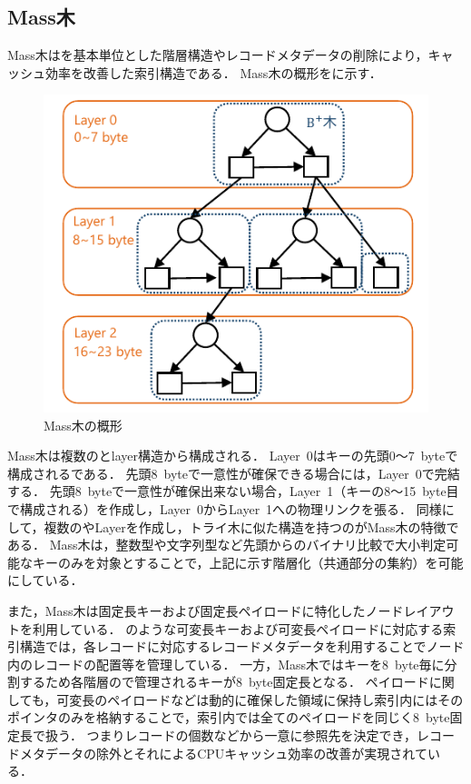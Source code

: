 \subsection{Mass木}
Mass木は\Bptree{}を基本単位とした階層構造やレコードメタデータの削除により，キャッシュ効率を改善した索引構造である．
Mass木の概形を\Fig{\ref{fig:masstree}}に示す．

\begin{figure}[t]
    \centering
    \includegraphics{./figures/masstree.pdf}
    \caption{Mass木の概形}
    \label{fig:masstree}
\end{figure}

Mass木は複数の\Bptree{}とlayer構造から構成される．
Layer~0はキーの先頭0～7~byteで構成される\Bptree{}である．
先頭8~byteで一意性が確保できる場合には，Layer~0で完結する．
先頭8~byteで一意性が確保出来ない場合，Layer~1（キーの8～15~byte目で構成される\Bptree{}）を作成し，Layer~0からLayer~1への物理リンクを張る．
同様にして，複数の\Bptree{}やLayerを作成し，トライ木に似た構造を持つのがMass木の特徴である．
Mass木は，整数型や文字列型など先頭からのバイナリ比較で大小判定可能なキーのみを対象とすることで，上記に示す階層化（共通部分の集約）を可能にしている．

また，Mass木は固定長キーおよび固定長ペイロードに特化したノードレイアウトを利用している．
\Bctree{}のような可変長キーおよび可変長ペイロードに対応する索引構造では，各レコードに対応するレコードメタデータを利用することでノード内のレコードの配置等を管理している．
一方，Mass木ではキーを8~byte毎に分割するため各階層の\Bptree{}で管理されるキーが8~byte固定長となる．
ペイロードに関しても，可変長のペイロードなどは動的に確保した領域に保持し索引内にはそのポインタのみを格納することで，索引内では全てのペイロードを同じく8~byte固定長で扱う．
つまりレコードの個数などから一意に参照先を決定でき，レコードメタデータの除外とそれによるCPUキャッシュ効率の改善が実現されている．

